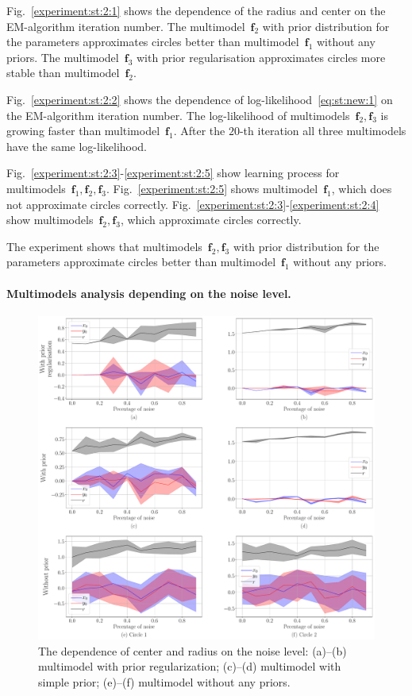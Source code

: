 \documentclass[12pt, twoside]{article}
\numberwithin{equation}{section}
\begin{document}
Fig.~\ref{experiment:st:2:1} shows the dependence of the radius and center on the EM-algorithm iteration number.
The multimodel~$\textbf{f}_2$ with prior distribution for the parameters approximates circles better than multimodel~$\textbf{f}_1$ without any priors.
The multimodel~$\textbf{f}_3$ with prior regularisation approximates circles more stable than multimodel~$\textbf{f}_2$.

Fig.~\ref{experiment:st:2:2} shows the dependence of log-likelihood~\eqref{eq:st:new:1} on the EM-algorithm iteration number.
The log-likelihood of multimodels~$\textbf{f}_2, \textbf{f}_3$ is growing faster than multimodel~$\textbf{f}_1$.  After the $20$-th iteration all three multimodels have the same log-likelihood.

Fig.~\ref{experiment:st:2:3}-\ref{experiment:st:2:5} show learning process for multimodels~$\textbf{f}_1, \textbf{f}_2, \textbf{f}_3$.
Fig.~\ref{experiment:st:2:5} shows multimodel~$\textbf{f}_1$, which does not approximate circles correctly.
Fig.~\ref{experiment:st:2:3}-\ref{experiment:st:2:4} show multimodels~$\textbf{f}_2, \textbf{f}_3$, which approximate circles correctly.

The experiment shows that multimodels~$\textbf{f}_2, \textbf{f}_3$ with prior distribution for the parameters approximate circles better than multimodel~$\textbf{f}_1$ without any priors.


\paragraph{Multimodels analysis depending on the noise level.} 
\begin{figure}[h!t]\center
\includegraphics[width=1\textwidth]{result_eng/experiment_synthetic_param_progress_noise}
\caption{The dependence of center and radius on the noise level: (a)--(b) multimodel with prior regularization; (c)--(d) multimodel with simple prior; (e)--(f) multimodel without any priors.}
\label{experiment:st:3:1}
\end{figure}
\end{document}
